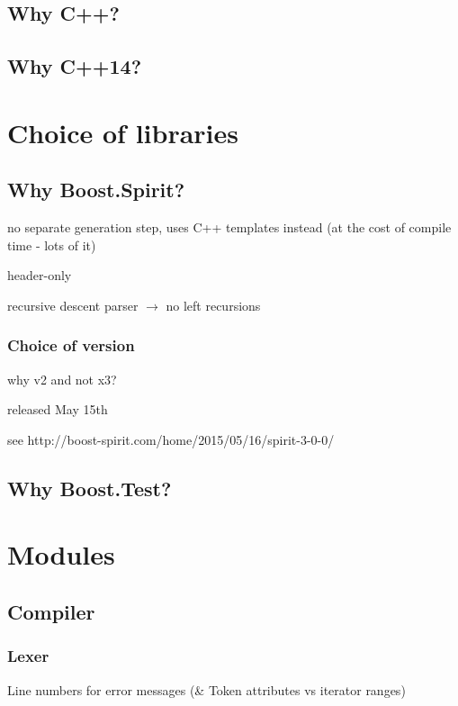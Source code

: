         \subsection{Why C++?}
        \subsection{Why C++14?}
    
    \section{Choice of libraries}
        \subsection{Why Boost.Spirit?}
            no separate generation step, uses C++ templates instead (at the cost of compile time - lots of it)
            
            header-only
            
            recursive descent parser $\rightarrow$ no left recursions
            \subsubsection{Choice of version}
                why v2 and not x3?
                
                released May 15th
                
                see http://boost-spirit.com/home/2015/05/16/spirit-3-0-0/
        \subsection{Why Boost.Test?}
    
    
    \section{Modules}
    
    
        \subsection{Compiler}
        
            \subsubsection{Lexer}
            Line numbers for error messages (\& Token attributes vs iterator ranges)
            
